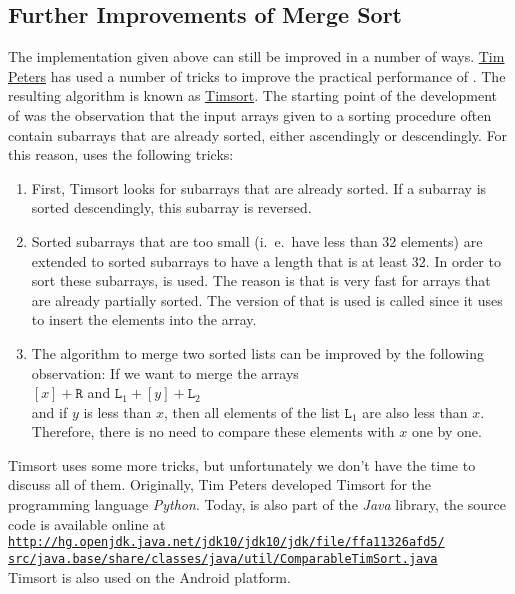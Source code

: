 \subsection{Further Improvements of Merge Sort}
The implementation given above can still be improved in a number of ways.  
\href{http://c2.com/cgi/wiki?TimPeters}{Tim Peters} has used a number of tricks to improve the
practical performance of .  The resulting algorithm is known as
\href{http://en.wikipedia.org/wiki/Timsort}{Timsort}.
The starting point of the development of  was the observation that the input arrays 
given to a sorting procedure often contain subarrays that are already sorted, either ascendingly or
descendingly.   For this reason,  uses the following tricks:
\begin{enumerate}
\item First, Timsort looks for subarrays that are already sorted.
      If a subarray is sorted descendingly, this subarray is reversed.
\item Sorted subarrays that are too small (i.~e.~have less than 32 elements) are extended
      to sorted subarrays to have a length that is at least 32.  In order to sort these subarrays,
       is used.  The reason is that  is very fast for
      arrays that are already partially sorted.  The version of  that is used is called
       since it uses 
      \href{http://en.wikipedia.org/wiki/Binary_search}{} to insert the elements
      into the array.
\item The algorithm to merge two sorted lists can be improved by the following observation: If we
      want to merge the arrays
      \\[0.2cm]
      \hspace*{1.3cm}
      $[x] + \mathtt{R}$ \quad and \quad $\mathtt{L}_1 + [y] + \mathtt{L}_2$
      \\[0.2cm]
      and if $y$ is less than $x$, then all elements of the list $\mathtt{L}_1$ are also less than $x$.
      Therefore, there is no need to compare these elements with $x$ one by one.  
\end{enumerate}
Timsort uses some more tricks, but unfortunately we don't have the time to discuss all of them.
Originally, Tim Peters developed Timsort for the programming language \textsl{Python}.  Today,
 is also part of the \textsl{Java} library, the source code is available online at
\\[0.2cm]
\hspace*{0.3cm}
\href{http://hg.openjdk.java.net/jdk10/jdk10/jdk/file/ffa11326afd5/src/java.base/share/classes/java/util/ComparableTimSort.java}{\texttt{http://hg.openjdk.java.net/jdk10/jdk10/jdk/file/ffa11326afd5/\\
\hspace*{1.5cm}
    src/java.base/share/classes/java/util/ComparableTimSort.java}}
\\[0.2cm]
Timsort is also used on the Android platform.

